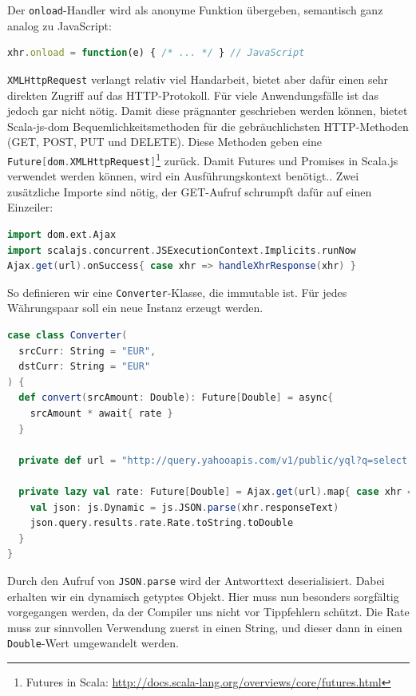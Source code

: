 \documentclass[a4paper, 12pt, hidelinks, listof=totoc, listoftables=totoc, bibliography=totoc]{scrreprt}
\newcommand{\code}[1]{\lstinline[language=Scala, style=inline]|#1|}
\newcommand{\scala}[1]{\lstinline[language=Scala, style=inline]|#1|}
\begin{document}
Der \scala{onload}-Handler wird als anonyme Funktion übergeben, semantisch ganz analog zu JavaScript:

\begin{lstlisting}[language=JavaScript, style=snippet]
xhr.onload = function(e) { /* ... */ } // JavaScript
\end{lstlisting}

\code{XMLHttpRequest} verlangt relativ viel Handarbeit, bietet aber dafür einen sehr direkten Zugriff auf das HTTP-Protokoll. Für viele Anwendungsfälle ist das jedoch gar nicht nötig. Damit diese prägnanter geschrieben werden können, bietet Scala-js-dom Bequemlichkeitsmethoden für die gebräuchlichsten HTTP-Methoden (GET, POST, PUT und DELETE). Diese Methoden geben eine \scala{Future[dom.XMLHttpRequest]}\footnote{Futures in Scala: \url{http://docs.scala-lang.org/overviews/core/futures.html}} zurück. Damit Futures und Promises in Scala.js verwendet werden können, wird ein Ausführungskontext benötigt.. \cite[\#Extensions]{scala-js-dom.DOC} Zwei zusätzliche Importe sind nötig, der GET-Aufruf schrumpft dafür auf einen Einzeiler:

\begin{lstlisting}[language=Scala, caption={Futures-basierter HTTP-Aufruf mit Scala.js-Bequemlichkeitsmethode.}]
import dom.ext.Ajax
import scalajs.concurrent.JSExecutionContext.Implicits.runNow
Ajax.get(url).onSuccess{ case xhr => handleXhrResponse(xhr) }
\end{lstlisting}

So definieren wir eine \scala{Converter}-Klasse, die immutable ist. Für jedes Währungspaar soll ein neue Instanz erzeugt werden.

\begin{lstlisting}[language=Scala, caption={Der Währungsumrechner.}]
case class Converter(
  srcCurr: String = "EUR",
  dstCurr: String = "EUR"
) {
  def convert(srcAmount: Double): Future[Double] = async{
    srcAmount * await{ rate }
  }

  private def url = "http://query.yahooapis.com/v1/public/yql?q=select * from yahoo.finance.xchange where pair in ('" + srcCurr + dstCurr + "')&format=json&env=store://datatables.org/alltableswithkeys"

  private lazy val rate: Future[Double] = Ajax.get(url).map{ case xhr =>
    val json: js.Dynamic = js.JSON.parse(xhr.responseText)
    json.query.results.rate.Rate.toString.toDouble
  }
}
\end{lstlisting}

Durch den Aufruf von \scala{JSON.parse} wird der Antworttext deserialisiert. Dabei erhalten wir ein dynamisch getyptes Objekt. Hier muss nun besonders sorgfältig vorgegangen werden, da der Compiler uns nicht vor Tippfehlern schützt. Die Rate muss zur sinnvollen Verwendung zuerst in einen String, und dieser dann in einen \scala{Double}-Wert umgewandelt werden.
\end{document}
